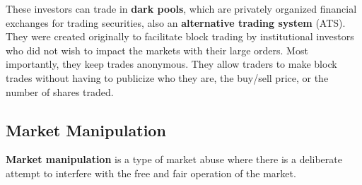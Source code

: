 \documentclass{article}
\begin{document}
    These investors can trade in \textbf{dark pools}, which are privately organized financial exchanges for trading securities, also an \textbf{alternative trading system} (ATS). They were created originally to facilitate block trading by institutional investors who did not wish to impact the markets with their large orders. Most importantly, they keep trades anonymous. They allow traders to make block trades without having to publicize who they are, the buy/sell price, or the number of shares traded. 

  \subsection{Market Manipulation}

    \textbf{Market manipulation} is a type of market abuse where there is a deliberate attempt to interfere with the free and fair operation of the market. 
\end{document}
